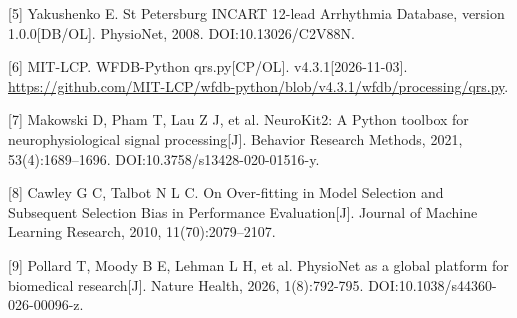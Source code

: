 \documentclass[UTF8,12pt,a4paper,fontset=none]{ctexart}
\begin{document}
{[}5{]} Yakushenko E. St Petersburg INCART 12-lead Arrhythmia Database, version 1.0.0{[}DB/OL{]}. PhysioNet, 2008. DOI:10.13026/C2V88N.

{[}6{]} MIT-LCP. WFDB-Python qrs.py{[}CP/OL{]}. v4.3.1{[}2026-11-03{]}. \url{https://github.com/MIT-LCP/wfdb-python/blob/v4.3.1/wfdb/processing/qrs.py}.

{[}7{]} Makowski D, Pham T, Lau Z J, et al. NeuroKit2: A Python toolbox for neurophysiological signal processing{[}J{]}. Behavior Research Methods, 2021, 53(4):1689--1696. DOI:10.3758/s13428-020-01516-y.

{[}8{]} Cawley G C, Talbot N L C. On Over-fitting in Model Selection and Subsequent Selection Bias in Performance Evaluation{[}J{]}. Journal of Machine Learning Research, 2010, 11(70):2079--2107.

{[}9{]} Pollard T, Moody B E, Lehman L H, et al. PhysioNet as a global platform for biomedical research{[}J{]}. Nature Health, 2026, 1(8):792-795. DOI:10.1038/s44360-026-00096-z.
\end{document}
